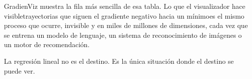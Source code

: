 \documentclass[12pt, a4paper]{article}
\begin{document}
\bigskip

GradienViz muestra la fila más sencilla de esa tabla. Lo que el
visualizador hace visible\textemdash trayectorias que siguen el gradiente
negativo hacia un mínimo\textemdash es el mismo proceso que ocurre,
invisible y en miles de millones de dimensiones, cada vez que se entrena
un modelo de lenguaje, un sistema de reconocimiento de imágenes o un
motor de recomendación.

La regresión lineal no es el destino. Es la única situación donde el
destino se puede ver.
\end{document}
